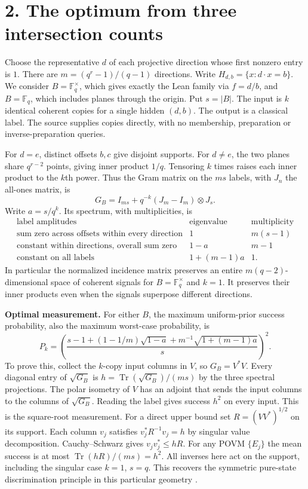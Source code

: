 \documentclass[11pt]{article}
\newcommand{\F}{\mathbb F_q}
\begin{document}
\newpage
\section*{2. The optimum from three intersection counts}
Choose the representative $d$ of each projective direction whose first
nonzero entry is $1$. There are $m=(q^r-1)/(q-1)$ directions. Write
$H_{d,b}=\{x:d\cdot x=b\}$. We consider $B=\F^\times$, which gives exactly
the Lean family via $f=d/b$, and $B=\F$, which includes planes through the
origin. Put $s=|B|$. The input is $k$ identical coherent copies for a single
hidden $(d,b)$. The output is a classical label. The source supplies copies
directly, with no membership, preparation or inverse-preparation queries.

For $d=e$, distinct offsets $b,c$ give disjoint supports. For $d\ne e$,
the two planes share $q^{r-2}$ points, giving inner product $1/q$.
Tensoring $k$ times raises each inner product to the $k$th power. Thus the
Gram matrix on the $ms$ labels, with $J_n$ the all-ones matrix, is
\[
  G_B= I_{ms}+q^{-k}(J_m-I_m)\otimes J_s.
\]
Write $a=s/q^k$. Its spectrum, with multiplicities, is
\[
\begin{array}{lcc}
\text{label amplitudes}&\text{eigenvalue}&\text{multiplicity}\\ \hline
\text{sum zero across offsets within every direction}&1&m(s-1)\\
\text{constant within directions, overall sum zero}&1-a&m-1\\
\text{constant on all labels}&1+(m-1)a&1 .
\end{array}
\]
In particular the normalized incidence matrix preserves an entire
$m(q-2)$-dimensional space of coherent signals for $B=\F^\times$ and $k=1$.
It preserves their inner products even when the signals superpose different
directions.

\textbf{Optimal measurement.} For either $B$, the maximum uniform-prior
success probability, also the maximum worst-case probability, is
\[
 \boxed{\displaystyle P_k=
 \left(\frac{s-1+(1-1/m)\sqrt{1-a}+m^{-1}\sqrt{1+(m-1)a}}{s}\right)^2 .}
\]
To prove this, collect the $k$-copy input columns in $V$, so $G_B=V^*V$.
Every diagonal entry of $\sqrt{G_B}$ is
$h=\operatorname{Tr}(\sqrt{G_B})/(ms)$ by the three spectral projections.
The polar isometry of $V$ has an adjoint that sends the input columns to
the columns of $\sqrt{G_B}$. Reading the label gives success $h^2$ on
every input. This is the square-root measurement. For a direct upper
bound set $R=(VV^*)^{1/2}$ on its support. Each column $v_j$ satisfies
$v_j^*R^{-1}v_j=h$ by singular value decomposition. Cauchy--Schwarz
gives $v_jv_j^*\le hR$. For any POVM $\{E_j\}$ the mean success is at most
$\operatorname{Tr}(hR)/(ms)=h^2$. All inverses here act on the support,
including the singular case $k=1$, $s=q$. This recovers the symmetric
pure-state discrimination principle in this particular geometry \cite{eldar}.
\end{document}
